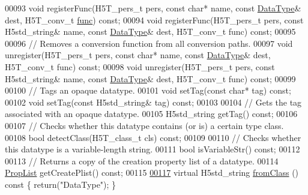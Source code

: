\begin{DoxyCode}
00093         \textcolor{keywordtype}{void} registerFunc(H5T\_pers\_t pers, \textcolor{keyword}{const} \textcolor{keywordtype}{char}* name, \textcolor{keyword}{const} \hyperlink{class_h5_1_1_data_type}{DataType}& dest, H5T\_conv\_t 
      \hyperlink{structfunc}{func}) \textcolor{keyword}{const};
00094         \textcolor{keywordtype}{void} registerFunc(H5T\_pers\_t pers, \textcolor{keyword}{const} H5std\_string& name, \textcolor{keyword}{const} 
      \hyperlink{class_h5_1_1_data_type}{DataType}& dest, H5T\_conv\_t func) \textcolor{keyword}{const};
00095 
00096         \textcolor{comment}{// Removes a conversion function from all conversion paths.}
00097         \textcolor{keywordtype}{void} unregister(H5T\_pers\_t pers, \textcolor{keyword}{const} \textcolor{keywordtype}{char}* name, \textcolor{keyword}{const} \hyperlink{class_h5_1_1_data_type}{DataType}& dest, H5T\_conv\_t func) \textcolor{keyword}{
      const};
00098         \textcolor{keywordtype}{void} unregister(H5T\_pers\_t pers, \textcolor{keyword}{const} H5std\_string& name, \textcolor{keyword}{const} 
      \hyperlink{class_h5_1_1_data_type}{DataType}& dest, H5T\_conv\_t func) \textcolor{keyword}{const};
00099 
00100         \textcolor{comment}{// Tags an opaque datatype.}
00101         \textcolor{keywordtype}{void} setTag(\textcolor{keyword}{const} \textcolor{keywordtype}{char}* tag) \textcolor{keyword}{const};
00102         \textcolor{keywordtype}{void} setTag(\textcolor{keyword}{const} H5std\_string& tag) \textcolor{keyword}{const};
00103 
00104         \textcolor{comment}{// Gets the tag associated with an opaque datatype.}
00105         H5std\_string getTag() \textcolor{keyword}{const};
00106 
00107         \textcolor{comment}{// Checks whether this datatype contains (or is) a certain type class.}
00108         \textcolor{keywordtype}{bool} detectClass(H5T\_class\_t cls) \textcolor{keyword}{const};
00109 
00110         \textcolor{comment}{// Checks whether this datatype is a variable-length string.}
00111         \textcolor{keywordtype}{bool} isVariableStr() \textcolor{keyword}{const};
00112 
00113         \textcolor{comment}{// Returns a copy of the creation property list of a datatype.}
00114         \hyperlink{class_h5_1_1_prop_list}{PropList} getCreatePlist() \textcolor{keyword}{const};
00115 
\hyperlink{class_h5_1_1_data_type_a54398643ff3dd5df349ab749192a2914}{00117}         \textcolor{keyword}{virtual} H5std\_string \hyperlink{class_h5_1_1_data_type_a54398643ff3dd5df349ab749192a2914}{fromClass} ()\textcolor{keyword}{ const }\{ \textcolor{keywordflow}{return}(\textcolor{stringliteral}{"DataType"}); \}

\end{DoxyCode}
